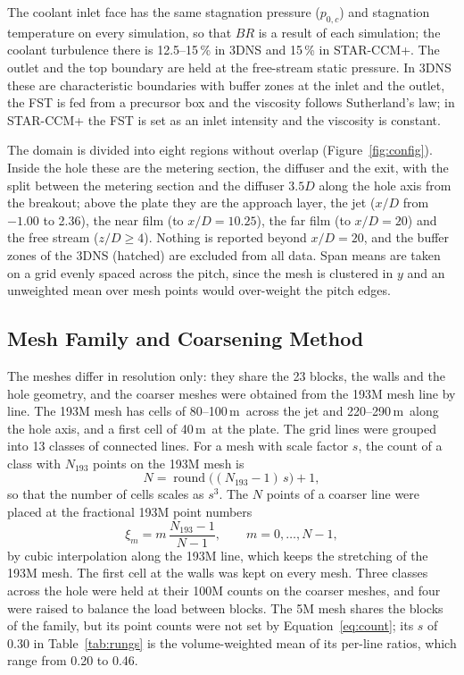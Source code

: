 \documentclass[colorlinks,upint,subscriptcorrection,varvw,hyphenate,balance,lineno]{asmeconf}
\newcommand*{\BR}{\mathit{BR}}
\newcommand*{\um}{\textmu m}
\begin{document}
The coolant inlet face has the same stagnation pressure ($p_{0,c}$) and stagnation temperature on every
simulation, so that $\BR$ is a result of each simulation; the coolant turbulence there is 12.5--15\,\% in 3DNS and
15\,\% in STAR-CCM+. The outlet and the top boundary are held at the free-stream static pressure. In 3DNS these are
characteristic boundaries with buffer zones at the inlet and the outlet, the FST is fed from a precursor box and the
viscosity follows Sutherland's law; in STAR-CCM+ the FST is set as an inlet intensity and the viscosity is
constant.

The domain is divided into eight regions without overlap (Figure~\ref{fig:config}). Inside the hole these are the
metering section, the diffuser and the exit, with the split between the metering section and the diffuser $3.5D$
along the hole axis from the breakout; above the plate they are the approach layer, the jet ($x/D$ from
$-1.00$ to 2.36), the near film (to $x/D=10.25$), the far film (to $x/D=20$) and the free stream ($z/D\geq4$).
Nothing is reported beyond $x/D=20$, and the buffer zones of the 3DNS (hatched) are excluded from all data. Span means are taken on a grid evenly spaced across the pitch, since the
mesh is clustered in $y$ and an unweighted mean over mesh points would over-weight the pitch edges.

\subsection{Mesh Family and Coarsening Method}\label{sec:mesh}

The meshes differ in resolution only: they share the 23 blocks, the walls and the hole geometry, and the coarser
meshes were obtained from the 193M mesh line by line. The 193M mesh has cells of 80--100\,\um\ across the jet and
220--290\,\um\ along the hole axis, and a first cell of 40\,\um\ at the plate. The grid lines were grouped into 13
classes of connected lines. For a mesh with scale factor $s$, the count of a class with $N_{193}$ points on the
193M mesh is
\begin{equation}\label{eq:count}
N=\operatorname{round}\!\big((N_{193}-1)\,s\big)+1,
\end{equation}
so that the number of cells scales as $s^3$. The $N$ points of a coarser line were placed at the fractional 193M
point numbers
\begin{equation}\label{eq:place}
\xi_m=m\,\frac{N_{193}-1}{N-1},\qquad m=0,\dots,N-1,
\end{equation}
by cubic interpolation along the 193M line, which keeps the stretching of the 193M mesh. The first cell at the
walls was kept on every mesh. Three classes across the hole were held at their 100M counts on the coarser meshes,
and four were raised to balance the load between blocks. The 5M mesh shares the blocks of the family, but its
point counts were not set by Equation~\ref{eq:count}; its $s$ of 0.30 in Table~\ref{tab:rungs} is the
volume-weighted mean of its per-line ratios, which range from 0.20 to 0.46.
\end{document}
